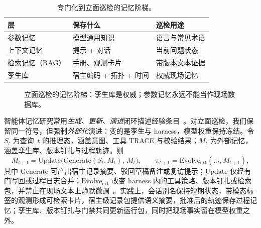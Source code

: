 \begin{table}[htbp]
\centering
\caption{专门化到立面巡检的记忆阶梯。}
\label{tab:ch8-memory}
\begin{tabular}{llp{5.2cm}}
\toprule
层 & 保存什么 & 巡检用途 \\
\midrule
参数记忆 & 模型通用知识 & 语言与常见术语 \\
上下文记忆 & 提示 + 对话 & 当前问题状态 \\
检索记忆（RAG） & 手册、观测卡片 & 带版本文本证据 \\
孪生库 & 宿主编码 + 拓扑 + 时间 & 权威现场记忆 \\
\bottomrule
\end{tabular}
\end{table}

\begin{figure}[htbp]
\centering
{}
\caption{立面巡检的记忆阶梯：孪生库是权威；参数记忆永远不能当作现场数据库。}
\label{fig:ch8-memory-ladder}
\end{figure}

智能体记忆研究常用\emph{生成、更新、演进}闭环描述经验条目~\cite{park2023generativeagents,yao2023react,wang2024surveyagents}。对立面巡检，我们保留同一符号，但强制\emph{外部化}演进：变的是孪生与 harness，模型权重保持冻结。令 $S_t$ 为查询~$t$ 的推理态，涵盖意图、工具 TRACE 与校验结果；$M_t$ 为外部记忆，涵盖孪生库、版本钉扎与过程轨迹。则
\begin{equation}
\label{eq:ch8-mem-loop}
M_{t+1}=\mathrm{Update}\!\bigl(\mathrm{Generate}(S_t,M_t),\,M_t\bigr),\qquad
\pi_{t+1}=\mathrm{Evolve}_{\mathrm{ext}}(\pi_t,M_{t+1}),
\end{equation}
其中 $\mathrm{Generate}$ 可产出宿主记录摘要、驳回草稿备注或复访提示；$\mathrm{Update}$ 仅经有门写回或过程日志合并；$\mathrm{Evolve}_{\mathrm{ext}}$ 改变 harness 内的工具策略、版本钉扎或检索包，并禁止在现场文本上静默微调~\cite{lewis2020,luo2025llmdtrobot,gao2026ifcagent}。实践上，会话别名保持短期状态，带模态标签的观测形成可检索卡片，宿主级记录包提供语义摘要，批准后的轨迹保存过程记忆；孪生库、版本钉扎与门禁共同更新运行包，同时把现场事实留在模型权重之外。

